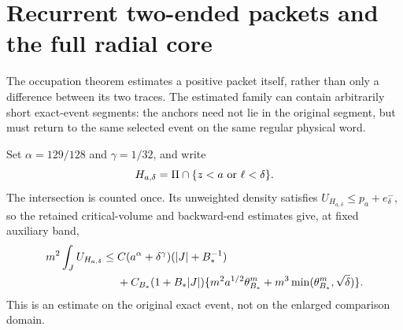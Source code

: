 \section{Recurrent two-ended packets and the full radial core}
\label{sec:v96-packets}
The occupation theorem estimates a positive packet itself, rather than
only a difference between its two traces. The estimated family can
contain arbitrarily short exact-event segments: the anchors need not
lie in the original segment, but must return to the same selected event
on the same regular physical word.

Set $\alpha=129/128$ and $\gamma=1/32$, and write
\[
 H_{a,\delta}=\Pi\cap\{z<a\ \hbox{or}\ \ell<\delta\}.
\]
The intersection is counted once. Its unweighted density satisfies
$U_{H_{a,\delta}}\le p_a+e^-_\delta$, so the retained critical-volume
and backward-end estimates give, at fixed auxiliary band,
\begin{align}
 m^2\int_JU_{H_{a,\delta}}
 \le{}&C(a^\alpha+\delta^\gamma)(|J|+B_*^{-1})\notag\\
 &+C_{B_*}(1+B_*|J|)
    \{m^2a^{1/2}\theta_{B_*}^m
       +m^3\min(\theta_{B_*}^m,\sqrt\delta)\}.
                                                \label{eq:v96-union-finite}
\end{align}
This is an estimate on the original exact event, not on the enlarged
comparison domain.

